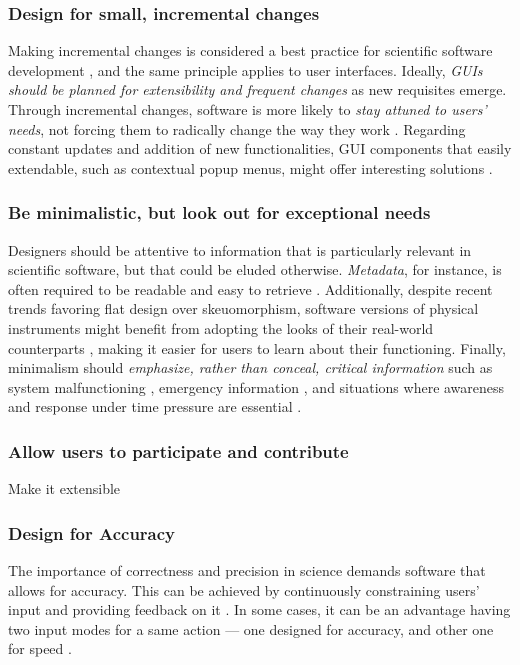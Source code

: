 \subsubsection{Design for small, incremental changes}
Making incremental changes is considered a best practice for scientific software development  \cite{bestprSC}, and the same principle applies to user interfaces. Ideally, \emph{GUIs should be planned for extensibility and frequent changes} as new requisites emerge. Through incremental changes, software is more likely to \emph{stay attuned to users' needs}, not forcing them to radically change the way they work \cite{DeRoure:2009}. Regarding constant updates and addition of new functionalities, GUI components that easily extendable, such as contextual popup menus, might offer interesting solutions \cite{MacLeod:1992}. 

\subsubsection{Be minimalistic, but look out for exceptional needs}

Designers should be attentive to information that is particularly relevant in scientific software, but that could be eluded otherwise. \emph{Metadata}, for instance, is often required to be readable and easy to retrieve  \cite{Talbott:2005, Baxter:2006, Macaulay:2009, Keefe:2010, DeMatos:2013, bestprSC, Thomer:2016}. Additionally, despite recent trends favoring flat design over skeuomorphism, software versions of physical instruments might benefit from adopting the looks of their real-world counterparts \cite{Foster:1998}, making it easier for users to learn about their functioning.  Finally, minimalism should \emph{emphasize, rather than conceal, critical information} such as system malfunctioning \cite{Morais:2014}, emergency information \cite{Ferguson:2016}, and situations where awareness and response under time pressure are essential \cite{Aragon:2008}.  


\subsubsection{Allow users to participate and contribute} Make it extensible

\subsubsection{Design for Accuracy}
The importance of correctness and precision  in  science demands software that allows for accuracy. This can be achieved by continuously constraining   users' input and  providing   feedback on it  \cite{Keefe:2010}. In some cases, it can be an advantage  having two input modes for a same action --- one designed for accuracy, and other one for speed \cite{MacLeod:1992}.    

